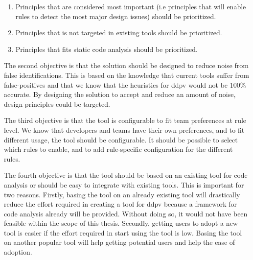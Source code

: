 \documentclass[pdftex,10pt,b5paper,twoside]{report}
\begin{document}
\begin{enumerate}
    \item Principles that are considered most important (i.e principles that will enable rules to detect the most major design issues) should be prioritized.
    
    \item Principles that is not targeted in existing tools should be prioritized.
    
    \item Principles that fits static code analysis should be prioritized.
\end{enumerate}

The second objective is that the solution should be designed to reduce noise from false identifications. This is based on the knowledge that current tools suffer from false-positives and that we know that the heuristics for \gls{ddpv} would not be 100\% accurate. By designing the solution to accept and reduce an amount of noise, design principles could be targeted.

The third objective is that the tool is configurable to fit team preferences at rule level. We know that developers and teams have their own preferences, and to fit different usage, the tool should be configurable. It should be possible to select which rules to enable, and to add rule-specific configuration for the different rules.

The fourth objective is that the tool should be based on an existing tool for code analysis or should be easy to integrate with existing tools. This is important for two reasons. Firstly, basing the tool on an already existing tool will drastically reduce the effort required in creating a tool for \gls{ddpv} because a framework for code analysis already will be provided. Without doing so, it would not have been feasible within the scope of this thesis. Secondly, getting users to adopt a new tool is easier if the effort required in start using the tool is low. Basing the tool on another popular tool will help getting potential users and help the ease of adoption.
\end{document}
